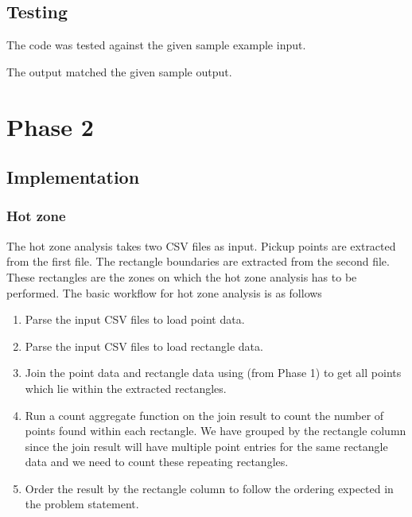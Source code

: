 \subsection{Testing}
The code was tested against the given sample example input.


The output matched the given sample output.


\newpage

\section{Phase 2} \label{Phase 2}

\subsection{Implementation}

\subsubsection{Hot zone}

The hot zone analysis takes two CSV files as input. Pickup points are extracted from the first file. The rectangle boundaries are extracted from the second file. These rectangles are the zones on which the hot zone analysis has to be performed. The basic workflow for hot zone analysis is as follows
\begin{enumerate}
    \item Parse the input CSV files to load point data.
    \item Parse the input CSV files to load rectangle data.
    \item  Join the point data and rectangle data using  (from Phase 1) to get all points which lie within the extracted rectangles. 
    \item Run a count aggregate function on the join result to count the number of points found within each rectangle. We have grouped by the rectangle column since the join result will have multiple point entries for the same rectangle data and we need to count these repeating rectangles.
    \item Order the result by the rectangle column to follow the ordering expected in the problem statement.
\end{enumerate}


